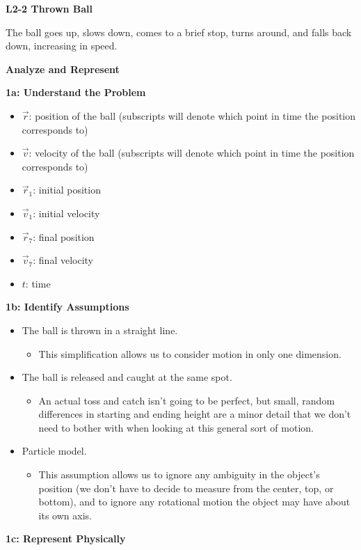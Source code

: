 \documentclass[]{article}
\begin{document}
\begin{TeacherMargin}
\noindent\textbf{L2-2 Thrown Ball}

The ball goes up, slows down, comes to a brief stop, turns around, and falls back down, increasing in speed.

\noindent\textbf{Analyze and Represent}

\noindent\textbf{1a: Understand the Problem}
\begin{itemize}
	\item $\vec{r}$: position of the ball (subscripts will denote which point in time the position corresponds to)
	\item $\vec{v}$: velocity of the ball (subscripts will denote which point in time the position corresponds to)
	\item $\vec{r}_{1}$: initial position
	\item $\vec{v}_{1}$: initial velocity
	\item $\vec{r}_{7}$: final position
	\item $\vec{v}_{7}$: final velocity
	\item $t$: time
\end{itemize}
\noindent\textbf{1b: Identify Assumptions}
\begin{itemize}
	\item The ball is thrown in a straight line.
	\begin{itemize}
		\item This simplification allows us to consider motion in only one dimension.
	\end{itemize}
	\item The ball is released and caught at the same spot.
	\begin{itemize}
		\item An actual toss and catch isn't going to be perfect, but small, random differences in starting and ending height are a minor detail that we don't need to bother with when looking at this general sort of motion.
	\end{itemize}
	\item Particle model.
	\begin{itemize}
		\item This assumption allows us to ignore any ambiguity in the object's position (we don't have to decide to measure from the center, top, or bottom), and to ignore any rotational motion the object may have about its own axis.
	\end{itemize}
\end{itemize}
\noindent\textbf{1c: Represent Physically}


\end{TeacherMargin}
\end{document}
